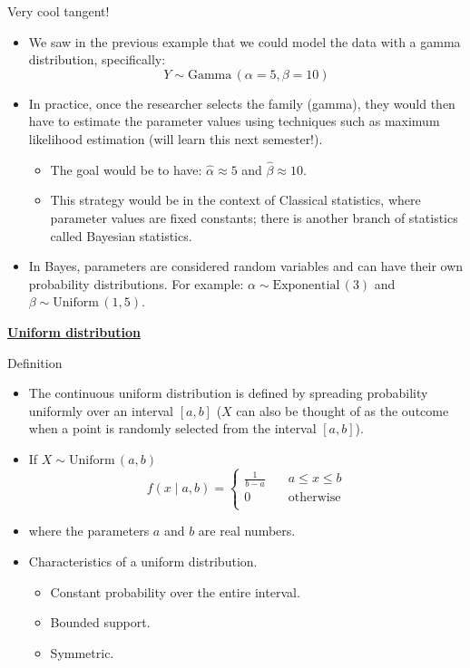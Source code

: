 \documentclass{article}
\newcommand{\bu}[1]{\textbf{\ul{#1}}}				%
\newcommand{\follow}[1]{\sim \text{#1}\,}		%
\begin{document}
Very cool tangent!\bigskip
\begin{itemize}
    \item We saw in the previous example that we could model the data with a gamma distribution, specifically:
    \[Y \follow{Gamma}(\alpha = 5, \beta = 10)\]
    \item In practice, once the researcher selects the family (gamma), they would then have to estimate the parameter values using techniques such as maximum likelihood estimation (will learn this next semester!).
    \begin{itemize}
        \item The goal would be to have: $\hat{\alpha} \approx 5$ and $\hat{\beta} \approx 10$.
        \item This strategy would be in the context of Classical statistics, where parameter values are fixed constants; there is another branch of statistics called Bayesian statistics.
    \end{itemize}
    \item In Bayes, parameters are considered random variables and can have their own probability distributions. For example: $\alpha \follow{Exponential}(3)$ and $\beta \follow{Uniform}(1, 5)$.
\end{itemize}\bigskip

\bu{Uniform distribution}\bigskip

Definition\bigskip
\begin{itemize}
    \item The continuous uniform distribution is defined by spreading probability uniformly over an interval $[a,b]$ ($X$ can also be thought of as the outcome when a point is randomly selected from the interval $[a,b]$).
    \item If $X \follow{Uniform}(a, b)$
    \[
    f(x \mid a, b) =
        \left\{
        \begin{array}{ll}
            \displaystyle \frac{1}{b - a} & \quad a \le x \le b\\
            0 & \quad \text{otherwise}\\
        \end{array}
        \right.
    \]
    \item[] where the parameters $a$ and $b$ are real numbers.\bigskip
    \item Characteristics of a uniform distribution.
    \begin{itemize}
        \item Constant probability over the entire interval.
        \item Bounded support.
        \item Symmetric.
    \end{itemize}
\end{itemize}
\end{document}
